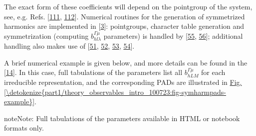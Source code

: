 \documentclass[letterpaper,table,10pt,english]{jupyterBook}
\begin{document}
\sphinxAtStartPar
The exact form of these coefficients will depend on the point\sphinxhyphen{}group of the system, see, e.g. Refs. {[}\hyperlink{cite.backmatter/bibliography:id545}{111}, \hyperlink{cite.backmatter/bibliography:id819}{112}{]}. Numerical routines for the generation of symmetrized harmonics are implemented in  {[}\hyperlink{cite.backmatter/bibliography:id668}{3}{]}: point\sphinxhyphen{}groups, character table generation and symmetrization (computing \(b_{hl\lambda}^{\Gamma\mu}\) parameters) is handled by  {[}\hyperlink{cite.backmatter/bibliography:id691}{55}, \hyperlink{cite.backmatter/bibliography:id692}{56}{]}; additional handling also makes use of  {[}\hyperlink{cite.backmatter/bibliography:id868}{51}, \hyperlink{cite.backmatter/bibliography:id936}{52}, \hyperlink{cite.backmatter/bibliography:id937}{53}, \hyperlink{cite.backmatter/bibliography:id938}{54}{]}.

\sphinxAtStartPar
A brief numerical example is given below, and more details can be found in the  {[}\hyperlink{cite.backmatter/bibliography:id667}{14}{]}. In this case, full tabulations of the parameters list all \(b_{hLM}^{\Gamma\mu}\) for each irreducible representation, and the corresponding PADs are illustrated in \hyperref[\detokenize{part1/theory_observables_intro_100723:fig-symharmpads-example}]{Fig.\@ \ref{\detokenize{part1/theory_observables_intro_100723:fig-symharmpads-example}}}.

\begin{sphinxShadowBox}
\sphinxstylesidebartitle{}

\begin{sphinxadmonition}{note}{Note:}
\sphinxAtStartPar
Full tabulations of the parameters available in HTML or notebook formats only.
\end{sphinxadmonition}
\end{sphinxShadowBox}
\end{document}
